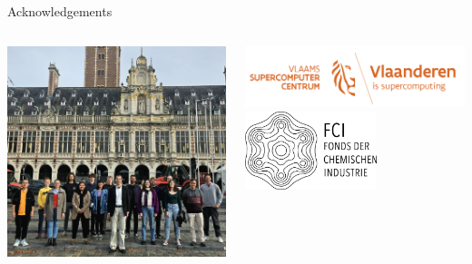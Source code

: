 \documentclass[9pt,t,xcolor=table]{beamer}
\begin{document}
\begin{frame}{\huge Acknowledgements}\large
	\centering
	\begin{columns}
		\begin{column}[c]{0.7\textwidth}
			\centering
			\includegraphics[width=\textwidth]{Figs/TJ.jpeg}
		\end{column}
		\begin{column}[c]{0.3\textwidth}
			\centering
			\includegraphics[width=\textwidth]{Figs/VSC-Combilogo.png}\\\vfill
			\includegraphics[width=0.6\textwidth]{Figs/FCI.png}\\\vfill

\end{column}
\end{columns}
\end{frame}
\end{document}

